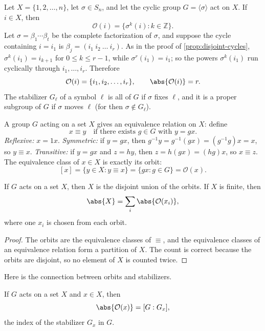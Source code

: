 \begin{eg}\label{eg:cyclic-perm-action}
	Let \(X = \{1, 2, \dots, n\}\), let \(\sigma \in S_n\), and let the cyclic group
	\(G = \langle\sigma\rangle\) act on \(X\). If \(i \in X\), then
	\[
		\mathcal O(i) = \{\sigma^k(i) : k \in \mathbb Z\}.
	\]
	Let \(\sigma = \beta_1\cdots\beta_{t}\) be the complete factorization of \(\sigma\),
	and suppose the cycle containing \(i = i_1\) is \(\beta_j = (i_1\ i_2\ \dots\ i_r)\).
	As in the proof of \autoref{prop:disjoint-cycles}, \(\sigma^k(i_1) = i_{k+1}\) for
	\(0 \leq k \leq r-1\), while \(\sigma^r(i_1) = i_1\); so the powers \(\sigma^k(i_1)\)
	run cyclically through \(i_1, \dots, i_r\). Therefore
	\[
		\mathcal O(i) = \{i_1, i_2, \dots, i_r\}, \qquad \abs{\mathcal O(i)} = r.
	\]
	The stabilizer \(G_\ell\) of a symbol \(\ell\) is all of \(G\) if \(\sigma\) fixes
	\(\ell\), and it is a proper subgroup of \(G\) if \(\sigma\) moves \(\ell\) (for then
	\(\sigma \notin G_\ell\)).
\end{eg}

A group \(G\) acting on a set \(X\) gives an equivalence relation on \(X\): define
\[
	x \equiv y \quad\text{if there exists } g \in G \text{ with } y = gx.
\]
\emph{Reflexive:} \(x = 1x\). \emph{Symmetric:} if \(y = gx\), then
\(g^{-1}y = g^{-1}(gx) = (g^{-1}g)x = x\), so \(y \equiv x\). \emph{Transitive:} if
\(y = gx\) and \(z = hy\), then \(z = h(gx) = (hg)x\), so \(x \equiv z\). The equivalence
class of \(x \in X\) is exactly its orbit:
\[
	[x] = \{y \in X : y \equiv x\} = \{gx : g \in G\} = \mathcal O(x).
\]

\begin{proposition}\label{prop:orbits-partition}
	If \(G\) acts on a set \(X\), then \(X\) is the disjoint union of the orbits. If \(X\)
	is finite, then
	\[
		\abs{X} = \sum_i \abs{\mathcal O(x_i)},
	\]
	where one \(x_i\) is chosen from each orbit.
\end{proposition}

\begin{proof}
	The orbits are the equivalence classes of \(\equiv\), and the equivalence classes of an
	equivalence relation form a partition of \(X\). The count is correct because the orbits
	are disjoint, so no element of \(X\) is counted twice.
\end{proof}

Here is the connection between orbits and stabilizers.

\begin{theorem}\label{thm:orbit-stabilizer}
	If \(G\) acts on a set \(X\) and \(x \in X\), then
	\[
		\abs{\mathcal O(x)} = [G : G_x],
	\]
	the index of the stabilizer \(G_x\) in \(G\).
\end{theorem}

